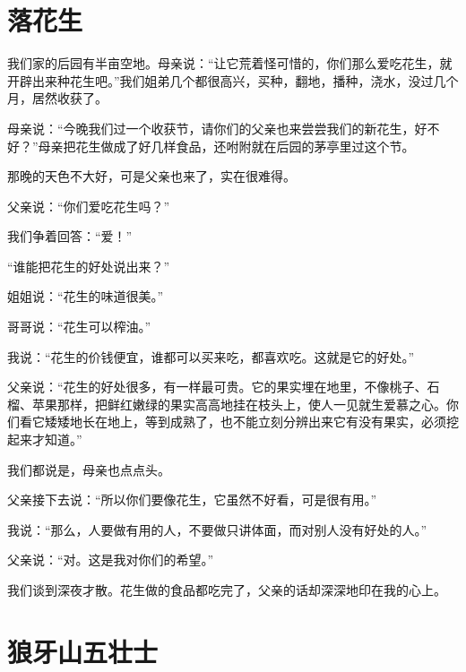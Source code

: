 \documentclass[12pt,UTF-8,openany]{ctexbook}
\begin{document}
\chapter{落花生}

\begin{large}
    
    我们家的后园有半亩空地。母亲说：“让它荒着怪可惜的，你们那么爱吃花生，就开辟出来种花生吧。”我们姐弟几个都很高兴，买种，翻地，播种，浇水，没过几个月，居然收获了。
    
    母亲说：“今晚我们过一个收获节，请你们的父亲也来尝尝我们的新花生，好不好？”母亲把花生做成了好几样食品，还咐附就在后园的茅亭里过这个节。
    
    那晚的天色不大好，可是父亲也来了，实在很难得。
    
    父亲说：“你们爱吃花生吗？”
    
    我们争着回答：“爱！”
    
    “谁能把花生的好处说出来？”
    
    姐姐说：“花生的味道很美。”
    
    哥哥说：“花生可以榨油。”
    
    我说：“花生的价钱便宜，谁都可以买来吃，都喜欢吃。这就是它的好处。”
    
    父亲说：“花生的好处很多，有一样最可贵。它的果实埋在地里，不像桃子、石榴、苹果那样，把鲜红嫩绿的果实高高地挂在枝头上，使人一见就生爱慕之心。你们看它矮矮地长在地上，等到成熟了，也不能立刻分辨出来它有没有果实，必须挖起来才知道。”
    
    我们都说是，母亲也点点头。
    
    父亲接下去说：“所以你们要像花生，它虽然不好看，可是很有用。”
    
    我说：“那么，人要做有用的人，不要做只讲体面，而对别人没有好处的人。”
    
    父亲说：“对。这是我对你们的希望。”
    
    我们谈到深夜才散。花生做的食品都吃完了，父亲的话却深深地印在我的心上。
    
\end{large}



\chapter{狼牙山五壮士}
\end{document}
